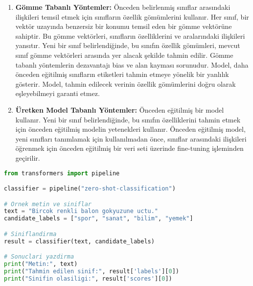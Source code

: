 \begin{enumerate}
    \item \textbf{Gömme Tabanlı Yöntemler:} Önceden belirlenmiş sınıflar arasındaki ilişkileri temsil etmek için sınıfların özellik gömümlerini kullanır. Her sınıf, bir vektör uzayında benzersiz bir konumu temsil eden bir gömme vektörüne sahiptir. Bu gömme vektörleri, sınıfların özelliklerini ve aralarındaki ilişkileri yansıtır. Yeni bir sınıf belirlendiğinde, bu sınıfın özellik gömümleri, mevcut sınıf gömme vektörleri arasında yer alacak şekilde tahmin edilir. Gömme tabanlı yöntemlerin dezavantajı bias ve alan kayması sorunudur. Model, daha önceden eğitilmiş sınıfların etiketleri tahmin etmeye yönelik bir yanlılık gösterir. Model, tahmin edilecek verinin özellik gömümlerini doğru olarak eşleyebilmeyi garanti etmez.
    \item \textbf{Üretken Model Tabanlı Yöntemler:} Önceden eğitilmiş bir model kullanır. Yeni bir sınıf belirlendiğinde, bu sınıfın özelliklerini tahmin etmek için önceden eğitilmiş modelin yetenekleri kullanır. Önceden eğitilmiş model, yeni sınıfları tanımlamak için kullanılmadan önce, sınıflar arasındaki ilişkileri öğrenmek için önceden eğitilmiş bir veri seti üzerinde fine-tuning işleminden geçirilir.
\end{enumerate}

\begin{lstlisting}[language=Python]
from transformers import pipeline

classifier = pipeline("zero-shot-classification")

# Ornek metin ve siniflar
text = "Bircok renkli balon gokyuzune uctu."
candidate_labels = ["spor", "sanat", "bilim", "yemek"]

# Siniflandirma
result = classifier(text, candidate_labels)

# Sonuclari yazdirma
print("Metin:", text)
print("Tahmin edilen sinif:", result['labels'][0])
print("Sinifin olasiligi:", result['scores'][0])
\end{lstlisting}

\newpage